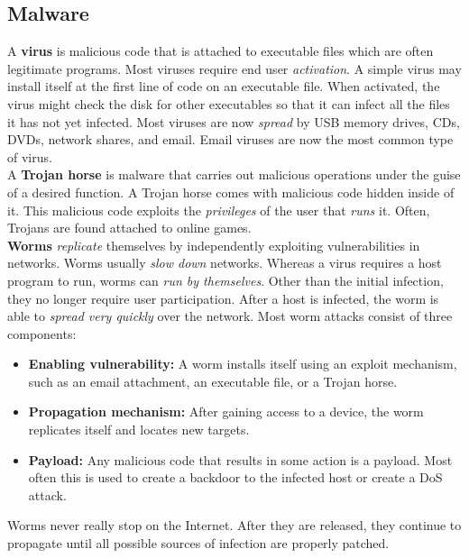 \subsection{Malware}

A \textbf{virus} is malicious code that is attached to executable files which are often legitimate programs. Most viruses require end user \emph{activation}. A simple virus may install itself at the first line of code on an executable file. When activated, the virus might check the disk for other executables so that it can infect all the files it has not yet infected. Most viruses are now \emph{spread} by USB memory drives, CDs, DVDs, network shares, and email. Email viruses are now the most common type of virus.\\

A \textbf{Trojan horse} is malware that carries out malicious operations under the guise of a desired function. A Trojan horse comes with malicious code hidden inside of it. This malicious code exploits the \emph{privileges} of the user that \emph{runs} it. Often, Trojans are found attached to online games. \\

\textbf{Worms} \emph{replicate} themselves by independently exploiting vulnerabilities in networks. Worms usually \emph{slow down} networks. Whereas a virus requires a host program to run, worms can \emph{run by themselves}. Other than the initial infection, they no longer require user participation. After a host is infected, the worm is able to \emph{spread very quickly} over the network. Most worm attacks consist of three components:

\begin{itemize}
\item \textbf{Enabling vulnerability:} A worm installs itself using an exploit mechanism, such as an email attachment, an executable file, or a Trojan horse.
\item \textbf{Propagation mechanism:} After gaining access to a device, the worm replicates itself and locates new targets.
\item \textbf{Payload:} Any malicious code that results in some action is a payload. Most often this is used to create a backdoor to the infected host or create a DoS attack.
\end{itemize}

\note Worms never really stop on the Internet. After they are released, they continue to propagate until all possible sources of infection are properly patched.\\

